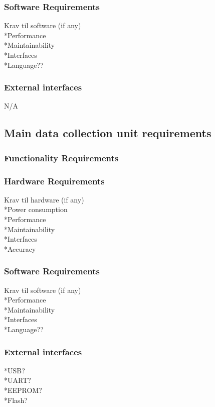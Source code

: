\subsubsection{Software Requirements}
Krav til software (if any)\\
*Performance\\
*Maintainability\\
*Interfaces\\
*Language??\\

\subsubsection{External interfaces}
N/A
\subsection{Main data collection unit requirements}

\subsubsection{Functionality Requirements}

\subsubsection{Hardware Requirements}
Krav til hardware (if any)\\
*Power consumption\\
*Performance\\
*Maintainability\\
*Interfaces\\
*Accuracy\\

\subsubsection{Software Requirements}
Krav til software (if any)\\
*Performance\\
*Maintainability\\
*Interfaces\\
*Language??\\

\subsubsection{External interfaces}
*USB?\\
*UART?\\
*EEPROM?\\
*Flash?\\

